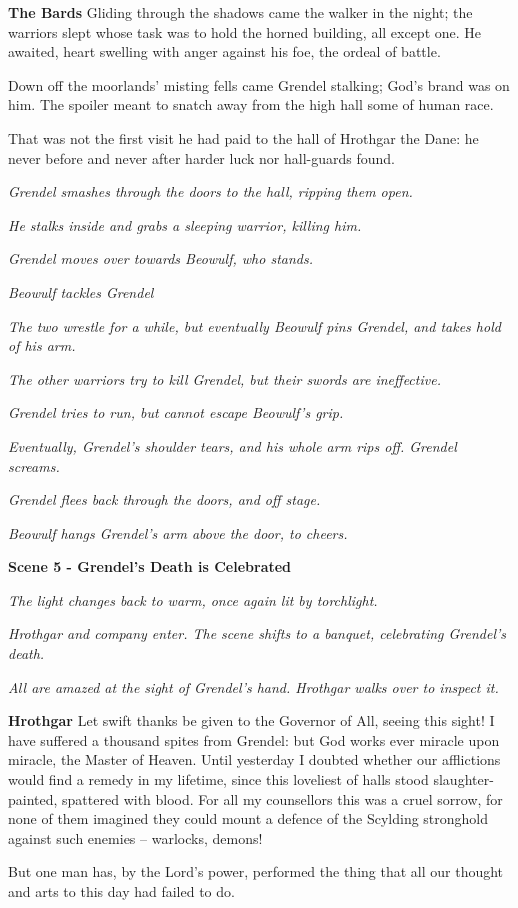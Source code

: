 \documentclass[a4paper]{article}
\begin{document}
{\textbf{The Bards} Gliding through the shadows came
the walker in the night; the warriors slept
whose task was to hold the horned building,
all except one. He awaited, heart swelling
with anger against his foe, the ordeal of battle.

Down off the moorlands’ misting fells came
Grendel stalking; God’s brand was on him.
The spoiler meant to snatch away
from the high hall some of human race.

That was not the first visit
he had paid to the hall of Hrothgar the Dane:
he never before and never after
harder luck nor hall-guards found.

\centerline{\textit{Grendel smashes through the doors to the hall, ripping them open.}}
\centerline{\textit{He stalks inside and grabs a sleeping warrior, killing him.}}
\centerline{\textit{Grendel moves over towards Beowulf, who stands.}}

\centerline{\textit{Beowulf tackles Grendel}}
\centerline{\textit{The two wrestle for a while, but eventually Beowulf pins Grendel, and takes hold of his arm.}}
\centerline{\textit{The other warriors try to kill Grendel, but their swords are ineffective.}}
\centerline{\textit{Grendel tries to run, but cannot escape Beowulf's grip.}}
\centerline{\textit{Eventually, Grendel's shoulder tears, and his whole arm rips off. Grendel screams.}}
\centerline{\textit{Grendel flees back through the doors, and off stage.}}
\centerline{\textit{Beowulf hangs Grendel's arm above the door, to cheers.}}

\centerline{\textbf{Scene 5 - Grendel's Death is Celebrated}}
\centerline{\textit{The light changes back to warm, once again lit by torchlight.}}
\centerline{\textit{Hrothgar and company enter. The scene shifts to a banquet, celebrating Grendel's death.}}
\centerline{\textit{All are amazed at the sight of Grendel's hand. Hrothgar walks over to inspect it.}}

\textbf{Hrothgar} Let swift thanks be given to the Governor of All,
seeing this sight! I have suffered a thousand
spites from Grendel: but God works ever
miracle upon miracle, the Master of Heaven.
Until yesterday I doubted whether
our afflictions would find a remedy
in my lifetime, since this loveliest of halls
stood slaughter-painted, spattered with blood.
For all my counsellors this was a cruel sorrow,
for none of them imagined they could mount a defence
of the Scylding stronghold against such enemies –
warlocks, demons!

But one man has,
by the Lord’s power, performed the thing
that all our thought and arts to this day
had failed to do. 

}
\end{document}
